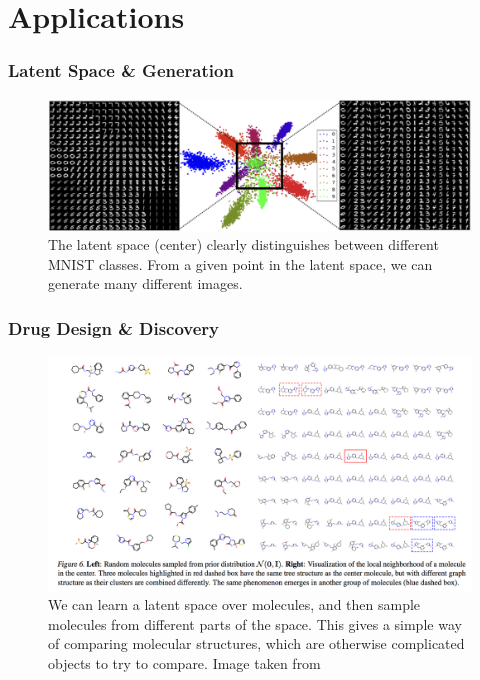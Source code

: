 \documentclass[10pt,mathserif]{beamer}
\begin{document}
\section{Applications}
\label{sec:applications}

\begin{frame}
  \frametitle{Latent Space \& Generation}
\begin{figure}[ht]
  \centering
  \includegraphics[width=0.8\paperwidth]{figure/vae_latent}
  \caption{The latent space (center) clearly distinguishes between different
    MNIST classes. From a given point in the latent space, we can generate many
    different images. \label{fig:vae_latent} }
\end{figure}
\end{frame}

\begin{frame}
  \frametitle{Drug Design \& Discovery}
\begin{figure}[ht]
  \centering
  \includegraphics[width=0.6\paperwidth]{figure/vae_molecule}
  \caption{We can learn a latent space over molecules, and then sample molecules
    from different parts of the space. This gives a simple way of comparing
    molecular structures, which are otherwise complicated objects to try to
    compare. Image taken from \citep{jin2018junction}}
\end{figure}
\end{frame}
\end{document}
